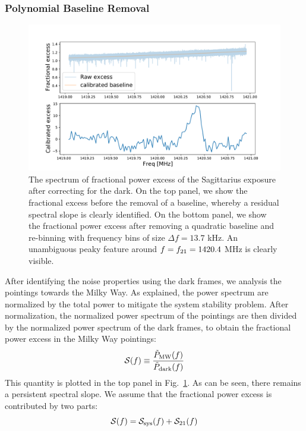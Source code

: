 \documentclass[12pt]{article}
\begin{document}
    \subsubsection{Polynomial Baseline Removal}
        \begin{figure}
	    \centering
	    \includegraphics[width=\textwidth]{plots/mw-21cm-baseline-calibration.pdf}
	    \caption{The spectrum of fractional power excess of the Sagittarius exposure after correcting for the dark. On the top panel, we show the fractional excess before the removal of a baseline, whereby a residual spectral slope is clearly identified. On the bottom panel, we show the fractional power excess after removing a quadratic baseline and re-binning with frequency bins of size $\Delta f=13.7$ kHz. An unambiguous peaky feature around $f = f_{\rm 21} = 1420.4$ MHz is clearly visible. } 
	    \label{fig: calibration}
	\end{figure}
    After identifying the noise properties using the dark frames, we analysis the pointings towards the Milky Way. 
    As explained, the power spectrum are normalized by the total power to mitigate the system stability problem. 
    After normalization, the normalized power spectrum of the pointings are then divided by the normalized power spectrum of the dark frames, to obtain the fractional power excess in the Milky Way pointings:
    \begin{equation} \label{eq: fractional-power-excess}
        \mathcal{S}(f) \equiv \frac{\Tilde{P}_{\rm MW}(f)}{\Tilde{P}_{\rm dark}(f)}
    \end{equation}
    This quantity is plotted in the top panel in Fig.~\ref{fig: calibration}. 
    As can be seen, there remains a persistent spectral slope.
    We assume that the fractional power excess is contributed by two parts:
    \begin{equation} \label{eq: power-excess-model}
        \mathcal{S}(f) = \mathcal{S}_{\rm sys}(f) + \mathcal{S}_{\rm 21}(f)
    \end{equation}
\end{document}
